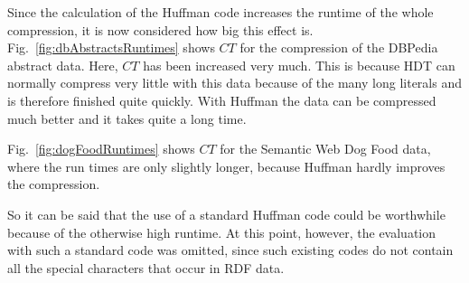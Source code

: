 Since the calculation of the Huffman code increases the runtime of the whole compression, it is now considered how big this effect is. Fig.~\ref{fig:dbAbstractsRuntimes} shows $CT$ for the compression of the DBPedia abstract data. Here, $CT$ has been increased very much. This is because HDT can normally compress very little with this data because of the many long literals and is therefore finished quite quickly. With Huffman the data can be compressed much better and it takes quite a long time.

Fig.~\ref{fig:dogFoodRuntimes} shows $CT$ for the Semantic Web Dog Food data, where the run times are only slightly longer, because Huffman hardly improves the compression.

So it can be said that the use of a standard Huffman code could be worthwhile because of the otherwise high runtime. At this point, however, the evaluation with such a standard code was omitted, since such existing codes do not contain all the special characters that occur in RDF data.


